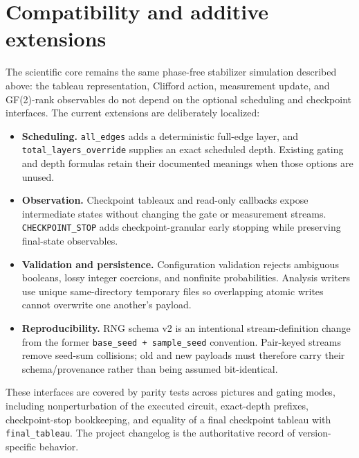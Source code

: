 \documentclass[11pt]{article}
\newcommand{\code}[1]{\texttt{#1}}
\begin{document}
\section{Compatibility and additive extensions}
\label{sec:changes}
The scientific core remains the same phase-free stabilizer simulation described above: the tableau representation,
Clifford action, measurement update, and GF(2)-rank observables do not depend on the optional scheduling and
checkpoint interfaces. The current extensions are deliberately localized:
\begin{itemize}[itemsep=2pt]
\item \textbf{Scheduling.} \code{all\_edges} adds a deterministic full-edge layer, and
\code{total\_layers\_override} supplies an exact scheduled depth. Existing gating and depth formulas retain their
documented meanings when those options are unused.
\item \textbf{Observation.} Checkpoint tableaux and read-only callbacks expose intermediate states without changing
the gate or measurement streams. \code{CHECKPOINT\_STOP} adds checkpoint-granular early stopping while preserving
final-state observables.
\item \textbf{Validation and persistence.} Configuration validation rejects ambiguous booleans, lossy integer
coercions, and nonfinite probabilities. Analysis writers use unique same-directory temporary files so overlapping
atomic writes cannot overwrite one another's payload.
\item \textbf{Reproducibility.} RNG schema v2 is an intentional stream-definition change from the former
\code{base\_seed + sample\_seed} convention. Pair-keyed streams remove seed-sum collisions; old and new payloads
must therefore carry their schema/provenance rather than being assumed bit-identical.
\end{itemize}
These interfaces are covered by parity tests across pictures and gating modes, including nonperturbation of the
executed circuit, exact-depth prefixes, checkpoint-stop bookkeeping, and equality of a final checkpoint tableau
with \code{final\_tableau}. The project changelog is the authoritative record of version-specific behavior.
\end{document}
